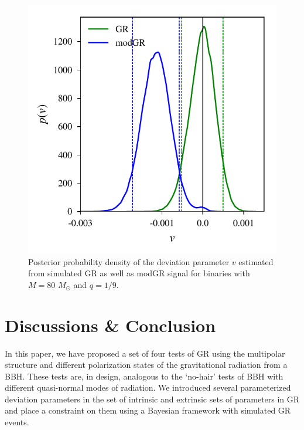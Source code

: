 \documentclass[prd,preprintnumbers,twocolumn,eqsecnum,floatfix,a4paper,nofootinbib,superscriptaddress]{revtex4}
\begin{document}
\begin{figure}[h]
	\begin{center}
		\includegraphics[scale=0.68]{figs/v1_modgr_hist_M_80_q_9_dL_250.pdf} 
	\end{center} 
	\caption{Posterior probability density of the deviation parameter $v$ estimated from simulated GR as well as modGR signal for binaries with $M=80$ $M_{\odot}$ and $q=1/9$. }
	\label{fig:cs_modgr}
\end{figure}

\section{Discussions \& Conclusion}
In this paper, we have proposed a set of four tests of GR using the multipolar structure and different polarization states of the gravitational radiation from a BBH. These tests are, in design, analogous to the `no-hair' tests of BBH with different quasi-normal modes of radiation. We introduced several parameterized deviation parameters in the set of intrinsic and extrinsic sets of parameters in GR and place a constraint on them using a Bayesian framework with simulated GR events.
\end{document}
